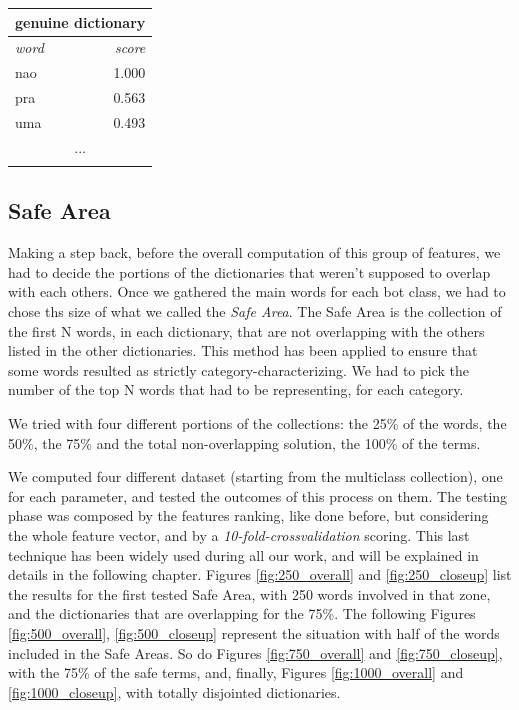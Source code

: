 \small
\begin{center}
	\begin{tabular}{lllll}
		\multicolumn{5}{c}{\textbf{genuine dictionary}} \\
		\hline\hline
		\multicolumn{4}{l}{\textit{word}} & 
		\multicolumn{1}{r}{\textit{score}}\\
		\hline\hline
		\multicolumn{4}{l}{nao} & 
		\multicolumn{1}{r}{1.000}\\
		\multicolumn{4}{l}{pra} & 
		\multicolumn{1}{r}{0.563}\\
		\multicolumn{4}{l}{uma} & 
		\multicolumn{1}{r}{0.493}\\
		\multicolumn{5}{c}{...} \\
		\hline\\
	\end{tabular}
\end{center}
\normalsize

\subsection{Safe Area}
Making a step back, before the overall computation of this group of features, we had to decide the portions of the dictionaries that weren't supposed to overlap with each others.
Once we gathered the main words for each bot class, we had to chose ths size of what we called the \textit{Safe Area}.
The Safe Area is the collection of the first N words, in each dictionary, that are not overlapping with the others listed in the other dictionaries.
This method has been applied to ensure that some words resulted as strictly category-characterizing.
We had to pick the number of the top N words that had to be representing, for each category.

We tried with four different portions of the collections: the 25\% of the words, the 50\%, the 75\% and the total non-overlapping solution, the 100\% of the terms.

We computed four different dataset (starting from the multiclass collection), one for each parameter, and tested the outcomes of this process on them. The testing phase was composed by the features ranking, like done before, but considering the whole feature vector, and by a \textit{10-fold-crossvalidation} scoring. This last technique has been widely used during all our work, and will be explained in details in the following chapter.
Figures \ref{fig:250_overall} and \ref{fig:250_closeup} list the results for the  first tested Safe Area, with 250 words involved in that zone, and the dictionaries that are overlapping for the 75\%. The following Figures \ref{fig:500_overall}, \ref{fig:500_closeup} represent the situation with half of the words included in the Safe Areas. So do Figures \ref{fig:750_overall} and \ref{fig:750_closeup}, with the 75\% of the safe terms, and, finally, Figures \ref{fig:1000_overall} and \ref{fig:1000_closeup}, with totally disjointed dictionaries.

